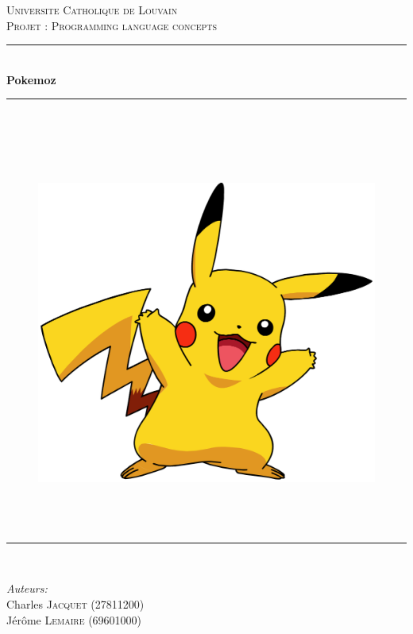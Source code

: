 \documentclass[a4paper,10pt]{article}
\newcommand{\HRule}{\rule{\linewidth}{0.5mm}}
\begin{document}
\begin{titlepage}

  \begin{center}


    \textsc{\Large Universite Catholique de Louvain}\\[1cm]

    \textsc{\LARGE{Projet : Programming language concepts  }}\\[1cm]


    \HRule \\[0.35cm]
    {\huge \bfseries Pokemoz}\\
    \HRule \\[0.35cm]
        \end{center}
      \begin{figure}[h!]
      \begin{center}
      \includegraphics[height=13cm]{pika.png}
      \end{center}
      \end{figure}

    \begin{center}
    \HRule \\[0.2cm]
  \end{center}

    \begin{minipage}{0.48\textwidth}
      \begin{flushleft} \large
        \textit{Auteurs:}\\
        Charles \textsc{Jacquet} (27811200)\\
        Jérôme \textsc{Lemaire} (69601000)\\ \vspace{0.3cm}



\end{flushleft}
\end{minipage}
\end{titlepage}
\end{document}
